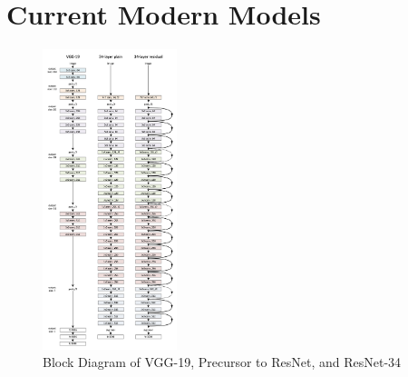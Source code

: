 \section{Current Modern Models}
\begin{figure}
\centering
    \includegraphics[width=0.35\textwidth]{ResNet50Graph.png}
    \caption{Block Diagram of VGG-19, Precursor to ResNet, and ResNet-34 \cite{ResNet50:He}}
    \label{fig:ResNet50Graph}
\end{figure}
